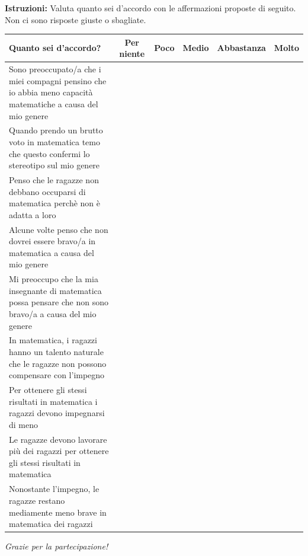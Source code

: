 \vspace{1cm}

\noindent\textbf{Istruzioni:} Valuta quanto sei d'accordo con le affermazioni proposte di seguito. Non ci sono risposte giuste o sbagliate.
\newline

\noindent
\begin{tabularx}{\textwidth}{|X|c|c|c|c|c|}
  \hline
  \textbf{Quanto sei d'accordo?} & \textbf{\scriptsize Per niente} & \textbf{\scriptsize Poco} & \textbf{\scriptsize Medio} & \textbf{\scriptsize Abbastanza} & \textbf{\scriptsize Molto} \\
  \hline
  Sono preoccupato/a che i miei compagni pensino che io abbia meno capacità matematiche a causa del mio genere & & & & & \\
  \hline
  Quando prendo un brutto voto in matematica temo che questo confermi lo stereotipo sul mio genere & & & & & \\
  \hline
  Penso che le ragazze non debbano occuparsi di matematica perchè non è adatta a loro & & & & & \\
  \hline
  Alcune volte penso che non dovrei essere bravo/a in matematica a causa del mio genere & & & & & \\
  \hline
  Mi preoccupo che la mia insegnante di matematica possa pensare che non sono bravo/a a causa del mio genere & & & & & \\
  \hline
  In matematica, i ragazzi hanno un talento naturale che le ragazze non possono compensare con l’impegno & & & & & \\
  \hline 
  Per ottenere gli stessi risultati in matematica i ragazzi devono impegnarsi di meno & & & & & \\
  \hline
  Le ragazze devono lavorare più dei ragazzi per ottenere gli stessi risultati in matematica & & & & & \\
  \hline
  Nonostante l’impegno, le ragazze restano mediamente meno brave in matematica dei ragazzi & & & & & \\
  \hline
\end{tabularx}

\vspace{2cm}
\centerline{\textit{Grazie per la partecipazione!}}

\restoregeometry
\setlength{\headwidth}{\textwidth}
\fancyhfoffset{0pt}
